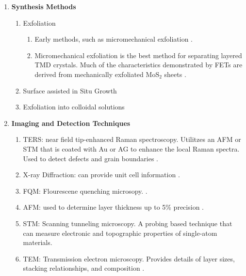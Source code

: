 \documentclass{article}
\begin{document}
\begin{enumerate}
	\item{\textbf{Synthesis Methods}}
		\begin{enumerate} %
			\item{Exfoliation}
				\begin{enumerate}
					\item{Early methods, such as micromechanical exfoliation \cite{nanoscaleReview2011,acsnanoReview2013}.}
					\item{Micromechanical exfoliation is the best method for separating layered TMD crystals. Much of the characteristics demonstrated by FETs are derived from mechanically exfoliated $\mathrm{MoS}_2$ sheets \cite{grapheneLike2Dreview2013}.}
				\end{enumerate}
			\item{Surface assisted in Situ Growth}
			\item{Exfoliation into colloidal solutions}
		\end{enumerate} %

	\item{\textbf{Imaging and Detection Techniques}}
		\begin{enumerate}
			\item{TERS: near field tip-enhanced Raman spectroscopy. Utilitzes an AFM or STM that is coated with Au or AG to enhance the local Raman spectra. Used to detect defects and grain boundaries \cite{acsnanoReview2013}.}
			\item{X-ray Diffraction: can provide unit cell information \cite{acsnanoReview2013}.}
			\item{FQM: Flourescene quenching microsopy. \cite{acsnanoReview2013}.}
			\item{AFM: used to determine layer thickness up to 5\% precision \cite{acsnanoReview2013, Fukuda2008, Osada2011}.}
			\item{STM: Scanning tunneling microscopy. A probing based technique that can measure electronic and topographic properties of single-atom materials. }
			\item{TEM: Transmission electron microscopy. Provides details of layer sizes, stacking relationships, and composition \cite{acsnanoReview2013}.}
		\end{enumerate}



\end{enumerate}
\end{document}
